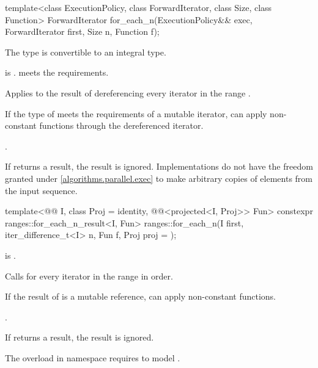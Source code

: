 %
\begin{itemdecl}
template<class ExecutionPolicy, class ForwardIterator, class Size, class Function>
  ForwardIterator for_each_n(ExecutionPolicy&& exec, ForwardIterator first, Size n,
                             Function f);
\end{itemdecl}

\begin{itemdescr}
\pnum
\mandates
The type  is convertible
to an integral type.

\pnum
\expects
{} is .
 meets the  requirements.

\pnum
\effects
Applies  to the result of dereferencing
every iterator in the range .
\begin{note}
If the type of  meets the requirements of a mutable iterator,
 can apply non-constant functions through the dereferenced iterator.
\end{note}

\pnum
\returns
{}.

\pnum
\remarks
If  returns a result, the result is ignored.
Implementations do not have
the freedom granted under \ref{algorithms.parallel.exec}
to make arbitrary copies of elements from the input sequence.
\end{itemdescr}

%
\begin{itemdecl}
template<@@ I, class Proj = identity,
         @@<projected<I, Proj>> Fun>
  constexpr ranges::for_each_n_result<I, Fun>
    ranges::for_each_n(I first, iter_difference_t<I> n, Fun f, Proj proj = {});
\end{itemdecl}

\begin{itemdescr}
\pnum
\expects
{} is .

\pnum
\effects
Calls 
for every iterator  in the range
 in order.
\begin{note}
If the result of  is a mutable reference,
 can apply non-constant functions.
\end{note}

\pnum
\returns
{}.

\pnum
\remarks
If  returns a result, the result is ignored.

\pnum
\begin{note}
The overload in namespace 
requires  to model .
\end{note}
\end{itemdescr}

